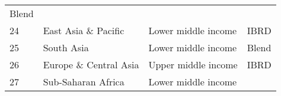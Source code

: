 \documentclass[
]{article}
\begin{document}
\begin{longtable}[]{@{}llll@{}}
\begin{minipage}[t]{0.16\columnwidth}
Blend\strut
\end{minipage}\tabularnewline
\begin{minipage}[t]{0.06\columnwidth}\raggedright
24\strut
\end{minipage} & \begin{minipage}[t]{0.17\columnwidth}\raggedright
East Asia \& Pacific\strut
\end{minipage} & \begin{minipage}[t]{0.11\columnwidth}\raggedright
Lower middle income\strut
\end{minipage} & \begin{minipage}[t]{0.16\columnwidth}\raggedright
IBRD\strut
\end{minipage}\tabularnewline
\begin{minipage}[t]{0.06\columnwidth}\raggedright
25\strut
\end{minipage} & \begin{minipage}[t]{0.17\columnwidth}\raggedright
South Asia\strut
\end{minipage} & \begin{minipage}[t]{0.11\columnwidth}\raggedright
Lower middle income\strut
\end{minipage} & \begin{minipage}[t]{0.16\columnwidth}\raggedright
Blend\strut
\end{minipage}\tabularnewline
\begin{minipage}[t]{0.06\columnwidth}\raggedright
26\strut
\end{minipage} & \begin{minipage}[t]{0.17\columnwidth}\raggedright
Europe \& Central Asia\strut
\end{minipage} & \begin{minipage}[t]{0.11\columnwidth}\raggedright
Upper middle income\strut
\end{minipage} & \begin{minipage}[t]{0.16\columnwidth}\raggedright
IBRD\strut
\end{minipage}\tabularnewline
\begin{minipage}[t]{0.06\columnwidth}\raggedright
27\strut
\end{minipage} & \begin{minipage}[t]{0.17\columnwidth}\raggedright
Sub-Saharan Africa\strut
\end{minipage} & \begin{minipage}[t]{0.11\columnwidth}\raggedright
Lower middle income\strut
\end{minipage} & \begin{minipage}[t]{0.16\columnwidth}\raggedright

\end{minipage}
\end{longtable}
\end{document}
